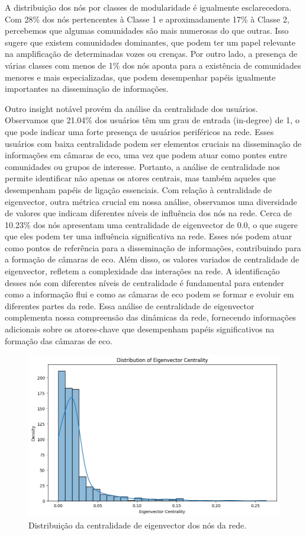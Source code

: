 A distribuição dos nós por classes de modularidade é igualmente esclarecedora. Com 28\% dos nós pertencentes à Classe 1 e aproximadamente 17\% à Classe 2, percebemos que algumas comunidades são mais numerosas do que outras. Isso sugere que existem comunidades dominantes, que podem ter um papel relevante na amplificação de determinadas vozes ou crenças. Por outro lado, a presença de várias classes com menos de 1\% dos nós aponta para a existência de comunidades menores e mais especializadas, que podem desempenhar papéis igualmente importantes na disseminação de informações.

Outro insight notável provém da análise da centralidade dos usuários. Observamos que 21.04\% dos usuários têm um grau de entrada (in-degree) de 1, o que pode indicar uma forte presença de usuários periféricos na rede. Esses usuários com baixa centralidade podem ser elementos cruciais na disseminação de informações em câmaras de eco, uma vez que podem atuar como pontes entre comunidades ou grupos de interesse. Portanto, a análise de centralidade nos permite identificar não apenas os atores centrais, mas também aqueles que desempenham papéis de ligação essenciais. Com relação à centralidade de eigenvector, outra métrica crucial em nossa análise, observamos uma diversidade de valores que indicam diferentes níveis de influência dos nós na rede. Cerca de 10.23\% dos nós apresentam uma centralidade de eigenvector de 0.0, o que sugere que eles podem ter uma influência significativa na rede. Esses nós podem atuar como pontos de referência para a disseminação de informações, contribuindo para a formação de câmaras de eco. Além disso, os valores variados de centralidade de eigenvector, refletem a complexidade das interações na rede. A identificação desses nós com diferentes níveis de centralidade é fundamental para entender como a informação flui e como as câmaras de eco podem se formar e evoluir em diferentes partes da rede. Essa análise de centralidade de eigenvector complementa nossa compreensão das dinâmicas da rede, fornecendo informações adicionais sobre os atores-chave que desempenham papéis significativos na formação das câmaras de eco.

\begin{figure}[h]
    \centering
    \includegraphics[scale=0.6]{images/eigencentrality.png}
    \caption{Distribuição da centralidade de eigenvector dos nós da rede.}
    \label{fig:eigencentrality}
	\fautor
\end{figure}

